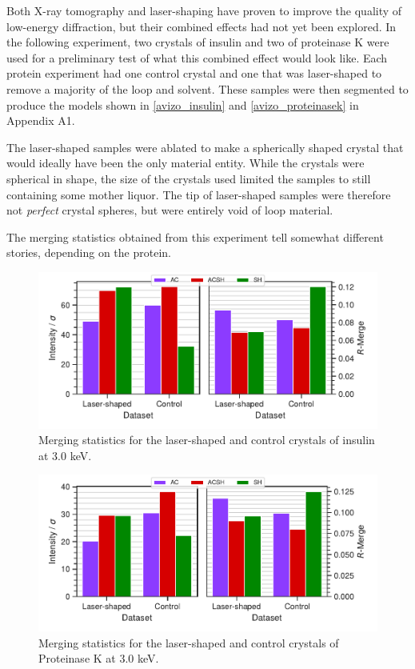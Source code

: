 Both X-ray tomography and laser-shaping have proven to improve the quality of low-energy diffraction, but their combined effects had not yet been explored. In the following experiment, two crystals of insulin and two of proteinase K were used for a preliminary test of what this combined effect would look like. Each protein experiment had one control crystal and one that was laser-shaped to remove a majority of the loop and solvent. These samples were then segmented to produce the models shown in \cref{avizo_insulin} and \cref{avizo_proteinasek} in Appendix A1.

The laser-shaped samples were ablated to make a spherically shaped crystal that would ideally have been the only material entity. While the crystals were spherical in shape, the size of the crystals used limited the samples to still containing some mother liquor. The tip of laser-shaped samples were therefore not \textit{perfect} crystal spheres, but were entirely void of loop material.

The merging statistics obtained from this experiment tell somewhat different stories, depending on the protein. 

\begin{figure}[h]
    \centering
    \includegraphics{plots/exp2/ins_stats.pdf}
    \caption{Merging statistics for the laser-shaped and control crystals of insulin at 3.0 \unit{keV}.}
    \label{fig:insulin}
\end{figure}

\begin{figure}[h]
    \centering
    \includegraphics{plots/exp2/prot_stats.pdf}
    \caption{Merging statistics for the laser-shaped and control crystals of Proteinase K at 3.0 \unit{keV}.}
    \label{fig:proteinasek}
\end{figure}

